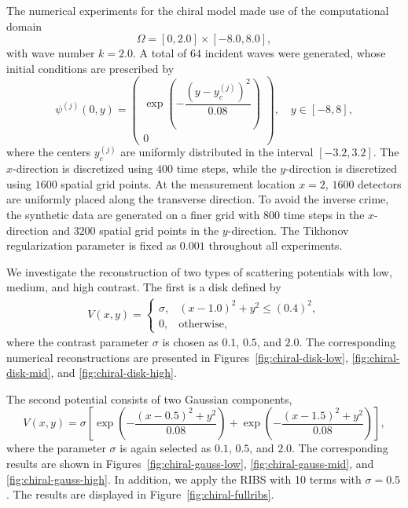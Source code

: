 \documentclass[12pt,reqno]{amsart}
\begin{document}
The numerical experiments for the chiral model made use of the computational domain
\[
\Omega = [0,2.0]\times[-8.0,8.0],
\]
with wave number \(k=2.0\).
A total of \(64\) incident waves were generated, whose initial conditions are prescribed by
\[
\psi^{(j)}(0,y)=
\begin{pmatrix}
\exp\!\left(-\dfrac{(y-y_c^{(j)})^2}{0.08}\right)\\[6pt]
0
\end{pmatrix},
\quad y\in[-8,8],
\]
where the centers \(y_c^{(j)}\) are uniformly distributed in the interval \([-3.2,3.2]\).
The \(x\)-direction is discretized using \(400\) time steps, while the \(y\)-direction is discretized using \(1600\) spatial grid points. At the measurement location \(x=2\), \(1600\) detectors are uniformly placed along the transverse direction. To avoid the inverse crime, the synthetic data are generated on a finer grid with \(800\) time steps in the \(x\)-direction and \(3200\) spatial grid points in the \(y\)-direction. The Tikhonov regularization parameter is fixed as \(0.001\) throughout all experiments.

We investigate the reconstruction of two types of scattering potentials with low, medium, and high contrast.
The first is a disk defined by
\begin{align*}
V(x,y)
=
\begin{cases}
\sigma, & (x-1.0)^2 + y^2 \le (0.4)^2,\\[6pt]
0, & \text{otherwise},
\end{cases}
\end{align*}
where the contrast parameter \(\sigma\) is chosen as \(0.1\), \(0.5\), and \(2.0\).
The corresponding numerical reconstructions are presented in
Figures~\ref{fig:chiral-disk-low}, \ref{fig:chiral-disk-mid}, and \ref{fig:chiral-disk-high}.

The second potential consists of two Gaussian components,
\[
V(x,y)
=\sigma\left[
\exp\!\left(-\frac{(x-0.5)^2+y^2}{0.08}\right)
+
\exp\!\left(-\frac{(x-1.5)^2+y^2}{0.08}\right)
\right],
\]
where the parameter \(\sigma\) is again selected as \(0.1\), \(0.5\), and \(2.0\).
The corresponding results are shown in
Figures~\ref{fig:chiral-gauss-low}, \ref{fig:chiral-gauss-mid}, and \ref{fig:chiral-gauss-high}.
In addition, we apply the RIBS with 10 terms  with \(\sigma=0.5\).
The results are displayed in Figure~\ref{fig:chiral-fullribs}.
\end{document}
